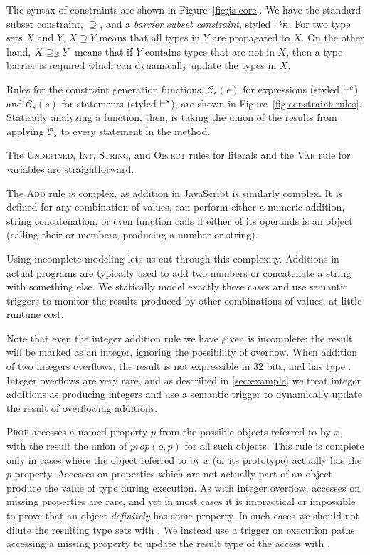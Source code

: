 The syntax of constraints are shown in Figure~\ref{fig:js-core}. We have the
standard subset constraint, $\supseteq$, and a \emph{barrier subset
  constraint}, styled $\supseteq_\mathcal{B}$. For two type sets $X$ and $Y$, $X \supseteq
Y$ means that all types in $Y$ are propagated to $X$. On the other hand, $X
\supseteq_\mathcal{B} Y$ means that if $Y$ contains types that are not in $X$, then a
type barrier is required which can dynamically update the types in $X$.

Rules for the constraint generation functions, $\mathcal{C}_e(e)$ for
expressions (styled $\vdash^e$) and $\mathcal{C}_s(s)$ for statements (styled $\vdash^s$),
are shown in
Figure~\ref{fig:constraint-rules}. Statically analyzing a function, then, is
taking the union of the results from applying $\mathcal{C}_s$ to every
statement in the method.

The \textsc{Undefined}, \textsc{Int}, \textsc{String}, and \textsc{Object}
rules for literals and the \textsc{Var} rule for variables are
straightforward.

The \textsc{Add} rule is complex, as addition in JavaScript is similarly complex. It is
defined for any combination of values, can perform either a numeric addition,
string concatenation, or even function calls if either of its operands is an
object (calling their  or  members, producing a
number or string).

Using incomplete modeling lets us cut through this complexity.
Additions in actual programs are typically used to add two numbers
or concatenate a string with something else.
We statically model exactly these cases
and use semantic triggers to monitor the results produced by other
combinations of values, at little runtime cost.

Note that even the integer addition rule we have given is incomplete: the
result will be marked as an integer, ignoring the possibility of
overflow. When addition of two integers overflows, the result is not
expressible in 32 bits, and has type .
Integer overflows are very rare, and as described in \Section\ref{sec:example}
we treat integer additions as producing integers
and use a semantic trigger to dynamically update the result of
overflowing additions.

\textsc{Prop} accesses a named property $p$ from the possible objects referred
to by $x$, with the result the union of $\mathit{prop}(o,p)$ for all such
objects.  This rule is complete only in cases where the object referred to by
$x$ (or its prototype) actually has the $p$ property. Accesses on properties
which are not actually part of an object produce the 
value of type  during execution.
As with integer overflow, accesses on missing properties are rare,
and yet in most cases it is impractical or impossible to prove that an object
\emph{definitely} has some property. In such cases we should not dilute the
resulting type sets with . We instead use a trigger
on execution paths accessing a missing property to update the result type
of the access with .

